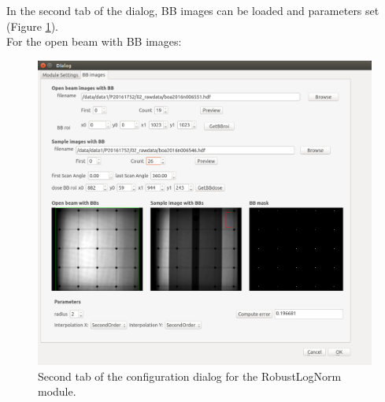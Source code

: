 \documentclass[a4paper]{scrreprt}
\begin{document}
In the second tab of the dialog, BB images can be loaded and parameters set (Figure \ref{fig:tab2_refmodule}). \\
For the open beam with BB images:
\begin{figure}[th!]
\centering
\includegraphics[scale=0.3]{./figures3/tab2_refmodule}
\caption{Second tab of the configuration dialog for the RobustLogNorm module.}
\label{fig:tab2_refmodule}
\end{figure}
\end{document}
